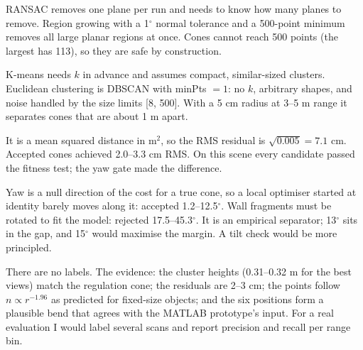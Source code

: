 \documentclass[10pt,a4paper]{scrartcl}
\renewcommand{\emph}[1]{\textcolor{accent}{#1}}
\begin{document}
  \begin{askbox}
  \small RANSAC removes one plane per run and needs to know how many planes to remove.
  Region growing with a 1$^\circ$ normal tolerance and a 500-point minimum removes all
  large planar regions at once. Cones cannot reach 500 points (the largest has 113),
  so they are safe by construction.
  \end{askbox}

  \begin{askbox}
  \small K-means needs $k$ in advance and assumes compact, similar-sized clusters.
  Euclidean clustering is DBSCAN with minPts $=1$: no $k$, arbitrary shapes, and noise
  handled by the size limits [8, 500]. With a 5 cm radius at 3--5 m range it separates
  cones that are about 1 m apart.
  \end{askbox}

  \begin{askbox}
  \small It is a mean \emph{squared} distance in m$^2$, so the RMS residual is
  $\sqrt{0.005}=7.1$ cm. Accepted cones achieved 2.0--3.3 cm RMS. On this scene every
  candidate passed the fitness test; the yaw gate made the difference.
  \end{askbox}

  \begin{askbox}
  \small Yaw is a null direction of the cost for a true cone, so a local optimiser
  started at identity barely moves along it: accepted 1.2--12.5$^\circ$. Wall
  fragments must be rotated to fit the model: rejected 17.5--45.3$^\circ$. It is an
  empirical separator; 13$^\circ$ sits in the gap, and 15$^\circ$ would maximise the
  margin. A tilt check would be more principled.
  \end{askbox}

  \begin{askbox}
  \small There are no labels. The evidence: the cluster heights (0.31--0.32 m for the best
  views) match the regulation cone; the residuals are 2--3 cm; the points follow
  $n\propto r^{-1.96}$ as predicted for fixed-size objects; and the six positions form a
  plausible bend that agrees with the MATLAB prototype's input. For a real evaluation I
  would label several scans and report precision and recall per range bin.
  \end{askbox}
\end{document}
